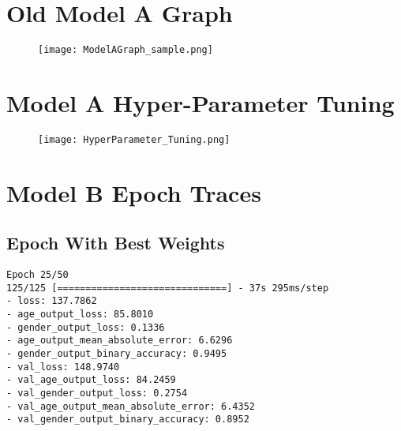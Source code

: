 \section{Old Model A Graph}
\begin{figure}[h!]
    \centering
    \texttt{[image: ModelAGraph\_sample.png]}
    \label{fig:modelA_original_graph_gs_neither}
\end{figure}
\newpage

\section{Model A Hyper-Parameter Tuning} \label{appendix:Model_A_Hyper-Parameter_Tuning}
\begin{figure}[h!]
    \centering
    \texttt{[image: HyperParameter\_Tuning.png]}
    \label{fig:modelA_hyperparam_tuning}
\end{figure}

\section{Model B Epoch Traces}
\subsection{Epoch With Best Weights}\label{appendix:modelB_best_epoch}
\begin{verbatim}
Epoch 25/50
125/125 [==============================] - 37s 295ms/step 
- loss: 137.7862 
- age_output_loss: 85.8010 
- gender_output_loss: 0.1336 
- age_output_mean_absolute_error: 6.6296 
- gender_output_binary_accuracy: 0.9495 
- val_loss: 148.9740 
- val_age_output_loss: 84.2459 
- val_gender_output_loss: 0.2754 
- val_age_output_mean_absolute_error: 6.4352 
- val_gender_output_binary_accuracy: 0.8952
\end{verbatim}
